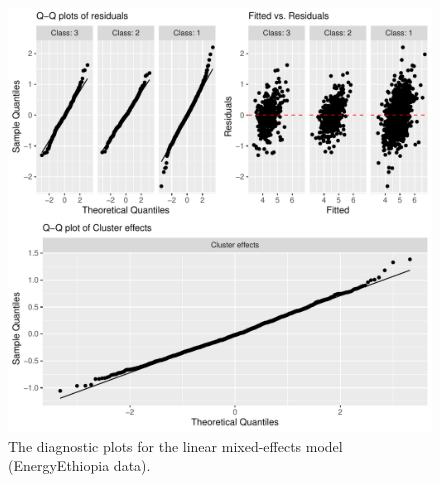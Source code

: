 \begin{figure}[htbp]
\centering
\includegraphics[width=0.7\linewidth]{diagnosis_model_energy.pdf} 
\caption{The diagnostic plots for the linear mixed-effects model (EnergyEthiopia data).}
\label{fig:diag-md-energy}
\end{figure}

